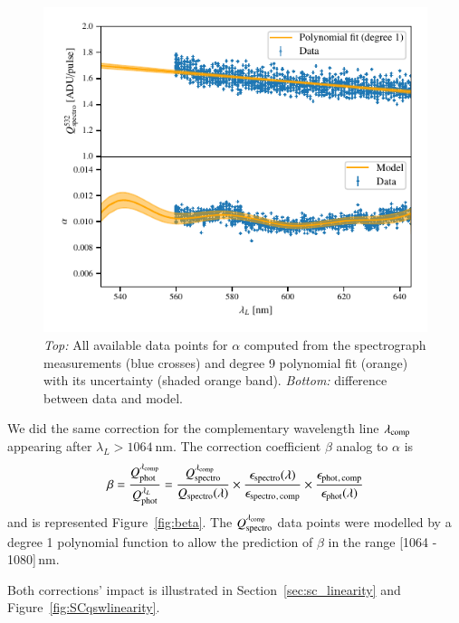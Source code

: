 \begin{figure}[h]
    \centering
    \includegraphics[width=\columnwidth]{fig/alpha_532_qswMAX.pdf}
    \caption{\textit{Top:} All available data points for $\alpha$ computed from the spectrograph measurements (blue crosses) and degree 9 polynomial fit (orange) with its uncertainty (shaded orange band). \textit{Bottom:} difference between data and model.}
    \label{fig:alpha_532}
\end{figure}


We did the same correction for the complementary wavelength line $\lambda_{\rm comp}$ appearing after $\lambda_L > \SI{1064}{\nm}$. The correction coefficient $\beta$ analog to $\alpha$ is
\begin{equation}
    \beta = \frac{Q_{\mathrm{phot}}^{\lambda_{\rm comp}}}{Q_{\mathrm{phot}}^{\lambda_L}} = \frac{Q_{\mathrm{spectro}}^{\lambda_{\rm comp}}}{Q_{\mathrm{spectro}}(\lambda)} \times \frac{\epsilon_{\mathrm{spectro}}(\lambda)}{\epsilon_{\mathrm{spectro}}{}_{\mathrm{, \, comp}}} \times \frac{\epsilon_{\mathrm{phot}}{}_{\mathrm{, \, comp}}}{\epsilon_{\mathrm{phot}}(\lambda)}  
    \label{eq:beta}
\end{equation}
and is represented Figure~\ref{fig:beta}. The $Q_{\mathrm{spectro}}^{\lambda_{\rm comp}}$ data points were modelled by a degree 1 polynomial function to allow the prediction of $\beta$ in the range [1064 - 1080]\,nm.

Both corrections' impact is illustrated in Section~\ref{sec:sc_linearity} and Figure~\ref{fig:SCqswlinearity}.


